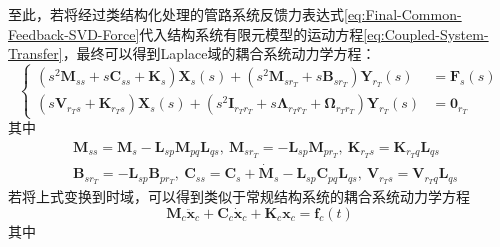 至此，若将经过类结构化处理的管路系统反馈力表达式\eqref{eq:Final-Common-Feedback-SVD-Force}代入结构系统有限元模型的运动方程\eqref{eq:Coupled-System-Transfer}，最终可以得到Laplace域的耦合系统动力学方程：
\begin{equation}
	\label{eq:Final-Coupled-System-Laplace}
	\left\{
	\begin{aligned}
	(s^2\boldsymbol{M}_{ss}+ s\boldsymbol{C}_{ss}+ \boldsymbol{K}_{s}) \boldsymbol{X}_{s}(s)+(s^2\boldsymbol{M}_{sr_T}+s\boldsymbol{B}_{sr_T}) \boldsymbol{Y}_{r_T}(s)&=\boldsymbol{F}_{s}(s) \\ 
	(s\boldsymbol{V}_{r_Ts}+\boldsymbol{K}_{r_Ts})\boldsymbol{X}_{s}(s)+(s^2\boldsymbol{I}_{r_Tr_T}+s\boldsymbol{\Lambda}_{r_Tr_T}+\boldsymbol{\Omega}_{r_Tr_T})\boldsymbol{Y}_{r_{T}}(s)&=\boldsymbol{0}_{r_T} 
	\end{aligned} \right.
\end{equation}
其中
\begin{displaymath}
	\begin{aligned}
		&\boldsymbol{M}_{ss}=\boldsymbol{M}_{s}-\boldsymbol{L}_{sp}\boldsymbol{M}_{pq}\boldsymbol{L}_{qs},\ 
		\boldsymbol{M}_{sr_T}=-\boldsymbol{L}_{sp}\boldsymbol{M}_{pr_T},\ 
		\boldsymbol{K}_{r_Ts}=\boldsymbol{K}_{r_Tq}\boldsymbol{L}_{qs} \\ 
		&\boldsymbol{B}_{sr_{T}}=-\boldsymbol{L}_{sp}\boldsymbol{B}_{pr_T},\ 
		\boldsymbol{C}_{ss}=\boldsymbol{C}_{s}+\dot{\boldsymbol{M}}_s -\boldsymbol{L}_{sp}\boldsymbol{C}_{pq}\boldsymbol{L}_{qs},\ 
		\boldsymbol{V}_{r_Ts}=\boldsymbol{V}_{r_Tq}\boldsymbol{L}_{qs} 
	\end{aligned}
\end{displaymath}
若将上式变换到时域，可以得到类似于常规结构系统的耦合系统动力学方程
\begin{equation}
	\label{eq:Final-Coupled-1D-Transfer}
	\boldsymbol{M}_c\ddot{\boldsymbol{x}}_c+\boldsymbol{C}_c\dot{\boldsymbol{x}}_c+\boldsymbol{K}_c\boldsymbol{x}_c=\boldsymbol{f}_c(t)
\end{equation}
其中
